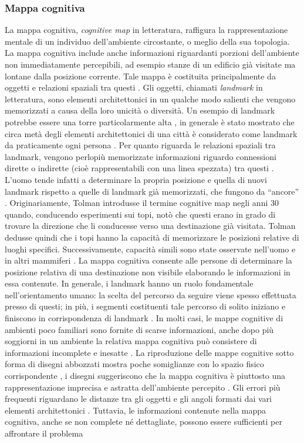 \documentclass[12pt,a4paper,openright,oneside]{book}
\begin{document}
\subsubsection{Mappa cognitiva} 
La mappa cognitiva, \emph{cognitive map} in letteratura, raffigura la rappresentazione mentale di un individuo dell’ambiente circostante, o meglio della sua topologia. La mappa cognitiva include anche informazioni riguardanti porzioni dell’ambiente non immediatamente percepibili, ad esempio stanze di un edificio già visitate ma lontane dalla posizione corrente. Tale mappa è costituita principalmente da oggetti e relazioni spaziali tra questi \cite{Grling1986ReferenceSI, Golledge1999}. Gli oggetti, chiamati \emph{landmark} in letteratura, sono elementi architettonici in un qualche modo salienti che vengono memorizzati a causa della loro unicità o diversità. Un esempio di landmark potrebbe essere una torre particolarmente alta \cite{Golledge1999}, in generale è stato mostrato che circa metà degli elementi architettonici di una città è considerato come landmark da praticamente ogni persona \cite{Golledge1978}. Per quanto riguarda le relazioni spaziali tra landmark, vengono perlopiù memorizzate informazioni riguardo connessioni dirette o indirette (cioè rappresentabili con una linea spezzata) tra questi \cite{Golledge1999}. L’uomo tende infatti a determinare la propria posizione e quella di nuovi landmark rispetto a quelle di landmark già memorizzati, che fungono da “ancore” \cite{Golledge1999}. Originariamente, Tolman introdusse il termine cognitive map negli anni 30 quando, conducendo esperimenti sui topi, notò che questi erano in grado di trovare la direzione che li conducesse verso una destinazione già visitata. Tolman \cite{TolmanCognitiveMapRats1948} dedusse quindi che i topi hanno la capacità di memorizzare le posizioni relative di luoghi specifici. Successivamente, capacità simili sono state osservate nell’uomo e in altri mammiferi \cite{EkstromCellularNetworks2003, Ekstrom2010}. La mappa cognitiva consente alle persone di determinare la posizione relativa di una destinazione non visibile elaborando le informazioni in essa contenute. In generale, i landmark hanno un ruolo fondamentale nell’orientamento umano: la scelta del percorso da seguire viene spesso effettuata presso di questi; in più, i segmenti costituenti tale percorso di solito iniziano e finiscono in corrispondenza di landmark \cite{Golledge1999}. In molti casi, le mappe cognitive di ambienti poco familiari sono fornite di scarse informazioni, anche dopo più soggiorni in un ambiente la relativa mappa cognitiva può consistere di informazioni incomplete e inesatte \cite{Golledge1999}. La riproduzione delle mappe cognitive sotto forma di disegni abbozzati mostra poche somiglianze con lo spazio fisico corrispondente \cite{Golledge1999}, i disegni suggeriscono che la mappa cognitiva è piuttosto una rappresentazione imprecisa e astratta dell'ambiente percepito \cite{Carlson2010}. Gli errori più frequenti riguardano le distanze tra gli oggetti e gli angoli formati dai vari elementi architettonici  \cite{Golledge1999, Ellard2009}. Tuttavia, le informazioni contenute nella mappa cognitiva, anche se non complete né dettagliate, possono essere sufficienti per affrontare il problema 
\end{document}
